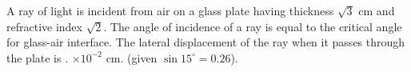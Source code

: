 \item A ray of light is incident from air on a glass plate having thickness $\sqrt{3}$ cm and refractive index $\sqrt{2}$. The angle of incidence of a ray is equal to the critical angle for glass-air interface. The lateral displacement of the ray when it passes through the plate is \underline{\hspace{2.5 cm}}. $\times 10^{-2}$ cm. (given $\sin 15^\circ = 0.26$).
    \begin{center}
    \end{center}